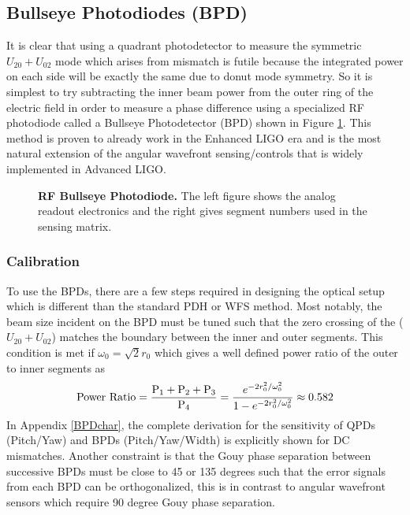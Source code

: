 	\subsection{Bullseye Photodiodes (BPD)}
	It is clear that using a quadrant photodetector to measure the symmetric $U_{20} + U_{02}$ mode which arises from mismatch is futile because the integrated power on each side will be exactly the same due to donut mode symmetry. So it is simplest to try subtracting the inner beam power from the outer ring of the electric field in order to measure a phase difference using a specialized RF photodiode called a Bullseye Photodetector (BPD) shown in Figure \ref{fig:BPD}.  This method is proven to already work in the Enhanced LIGO era \cite{MuellerMM} and is the most natural extension of the angular wavefront sensing/controls that is widely implemented in Advanced LIGO.
	
	\begin{figure}[h]
		\centering
		\caption[RF Bullseye Photodiode.]
		{\textbf{RF Bullseye Photodiode.}  The left figure shows the analog readout electronics and the right gives segment numbers used  in the sensing matrix.
		}
		\label{fig:BPD}
	\end{figure}
	
	\subsubsection{Calibration}
		To use the BPDs, there are a few steps required in designing the optical setup which is different than the standard PDH or WFS method.  Most notably, the beam size incident on the BPD must be tuned such that the zero crossing of the ($U_{20} + U_{02}$) matches the boundary between the inner and outer segments.  This condition is met if $\omega_{0} = \sqrt{2} r_0$ which gives a well defined power ratio of the outer to inner segments as 
		\begin{equation}
		\text{Power Ratio} = \frac{\text{P}_1 + \text{P}_2 + \text{P}_3}{\text{P}_4}  \\
		= \frac{e^{-2r_0^2/ \omega_{0}^2}} {1 - e^{-2r_0^2/ \omega_{0}^2 }} \approx 0.582
		\end{equation}
		In Appendix \ref{BPDchar}, the complete derivation for the sensitivity of QPDs (Pitch/Yaw) and BPDs (Pitch/Yaw/Width) is explicitly shown for DC mismatches.  Another constraint is that the Gouy phase separation between successive BPDs must be close to 45 or 135 degrees such that the error signals from each BPD can be orthogonalized, this is in contrast to angular wavefront sensors which require 90 degree Gouy phase separation.  
		
